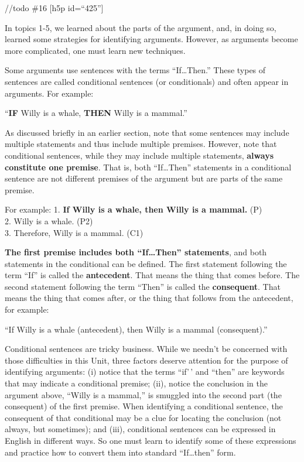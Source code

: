 \documentclass[
]{book}
\begin{document}
//todo \#16
{[}h5p id=``425''{]}

In topics 1-5, we learned about the parts of the argument, and, in doing so, learned some strategies for identifying arguments. However, as arguments become more complicated, one must learn new techniques.

Some arguments use sentences with the terms ``If\ldots Then.'' These types of sentences are called conditional sentences (or conditionals) and often appear in arguments. For example:

``\textbf{IF} Willy is a whale, \textbf{THEN} Willy is a mammal.''

As discussed briefly in an earlier section, note that some sentences may include multiple statements and thus include multiple premises. However, note that conditional sentences, while they may include multiple statements, \textbf{always constitute one premise}. That is, both ``If\ldots Then'' statements in a conditional sentence are not different premises of the argument but are parts of the same premise.

For example:
1. \textbf{If Willy is a whale, then Willy is a mammal.} (P)\\
2. Willy is a whale. (P2)\\
3. Therefore, Willy is a mammal. (C1)

\textbf{The first premise includes both ``If\ldots Then'' statements}, and both statements in the conditional can be defined. The first statement following the term ``If'' is called the \textbf{antecedent}. That means the thing that comes before. The second statement following the term ``Then'' is called the \textbf{consequent}. That means the thing that comes after, or the thing that follows from the antecedent, for example:

``If Willy is a whale (antecedent), then Willy is a mammal (consequent).''

Conditional sentences are tricky business. While we needn't be concerned with those difficulties in this Unit, three factors deserve attention for the purpose of identifying arguments: (i) notice that the terms ``if'\,' and ``then'' are keywords that may indicate a conditional premise; (ii), notice the conclusion in the argument above, ``Willy is a mammal,'' is smuggled into the second part (the consequent) of the first premise. When identifying a conditional sentence, the consequent of that conditional may be a clue for locating the conclusion (not always, but sometimes); and (iii), conditional sentences can be expressed in English in different ways. So one must learn to identify some of these expressions and practice how to convert them into standard ``If\ldots then'' form.
\end{document}
